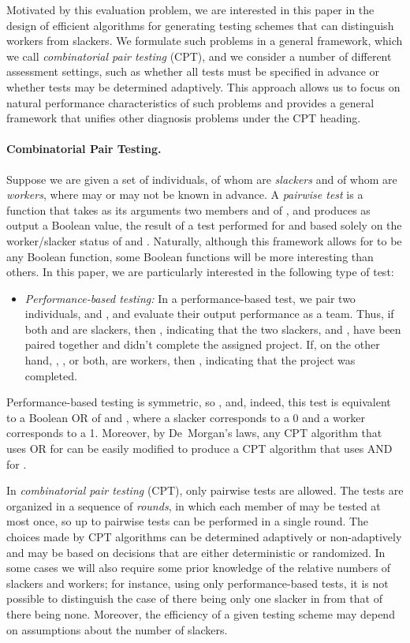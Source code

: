 \documentclass[11pt]{llncs}
\renewcommand{\subsection}[1]{\paragraph{\bf #1.}}
\begin{document}
Motivated by this evaluation problem,
we are interested in this paper in
the design of efficient algorithms for generating testing schemes that can distinguish
workers from slackers.
We formulate such problems in a general framework, which we call
\emph{combinatorial pair testing} (CPT), and we consider a number of different
assessment settings, such as whether
all tests must be specified in advance
or whether tests may be determined adaptively.
This approach allows us to focus on natural performance
characteristics of such problems and
provides a general framework that unifies other 
diagnosis problems under the CPT heading.

\subsection{Combinatorial Pair Testing}
Suppose we are given a set  of  individuals,  of whom
are \emph{slackers} and  of whom are \emph{workers},
where  may or may not be known in advance.
A \emph{pairwise test} is a function  that takes as its arguments two members
 and  of , 
and produces as output a Boolean value, the result of a test 
performed for  and  based solely on the 
worker/slacker status of  and .
Naturally,
although this framework allows for  to be any Boolean function,
some Boolean functions will be more interesting
than others. 
In this paper,
we are particularly interested in the following type of test:
\begin{itemize}
\item
\emph{Performance-based testing:} In a performance-based test,
we pair two individuals,  and ,
and evaluate their output performance as a team.
Thus, if both  and  are slackers, then
, indicating that 
the two slackers,  and , have been paired 
together and didn't complete the assigned project.
If, on the other hand, , , or both, are workers, then
, indicating that 
the project was completed.
\end{itemize}
Performance-based testing is symmetric, 
so , and, indeed, this test is 
equivalent to a Boolean OR of  and , 
where a slacker corresponds to a 0 and a worker corresponds to a 1.
Moreover, by 
De~Morgan's laws, any CPT algorithm that uses OR for  can 
be easily modified to produce a CPT algorithm that uses AND for .

In \emph{combinatorial pair testing} (CPT), only
pairwise tests are allowed. The tests are organized in a sequence of \emph{rounds}, 
in which each member of  may be tested at most once, so up to  pairwise tests can be performed in a single round. 
The choices made by CPT algorithms
can be determined adaptively or non-adaptively
and may be based on decisions that are either deterministic or randomized.
In some cases we will also require some prior knowledge of the relative numbers
of slackers and workers; for instance, using only performance-based tests,
it is not possible to distinguish the case of there being
only one slacker in  from that of there being none.
Moreover, the efficiency of a given testing scheme may depend on
assumptions about the number of slackers.
\end{document}
